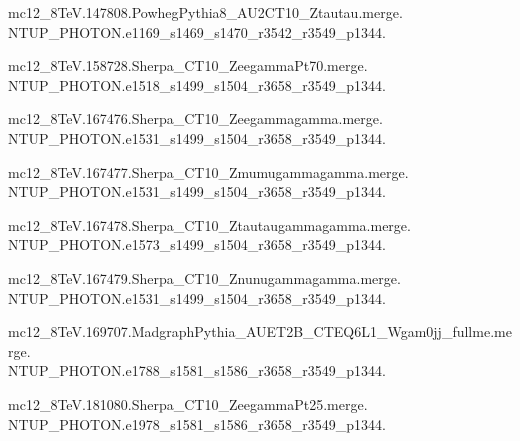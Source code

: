 mc12\_8TeV.147808.PowhegPythia8\_AU2CT10\_Ztautau.merge. \\NTUP\_PHOTON.e1169\_s1469\_s1470\_r3542\_r3549\_p1344.

mc12\_8TeV.158728.Sherpa\_CT10\_ZeegammaPt70.merge. \\NTUP\_PHOTON.e1518\_s1499\_s1504\_r3658\_r3549\_p1344.

mc12\_8TeV.167476.Sherpa\_CT10\_Zeegammagamma.merge. \\NTUP\_PHOTON.e1531\_s1499\_s1504\_r3658\_r3549\_p1344.

mc12\_8TeV.167477.Sherpa\_CT10\_Zmumugammagamma.merge. \\NTUP\_PHOTON.e1531\_s1499\_s1504\_r3658\_r3549\_p1344.

mc12\_8TeV.167478.Sherpa\_CT10\_Ztautaugammagamma.merge. \\NTUP\_PHOTON.e1573\_s1499\_s1504\_r3658\_r3549\_p1344.

mc12\_8TeV.167479.Sherpa\_CT10\_Znunugammagamma.merge. \\NTUP\_PHOTON.e1531\_s1499\_s1504\_r3658\_r3549\_p1344.

mc12\_8TeV.169707.MadgraphPythia\_AUET2B\_CTEQ6L1\_Wgam0jj\_fullme.merge. \\NTUP\_PHOTON.e1788\_s1581\_s1586\_r3658\_r3549\_p1344.

mc12\_8TeV.181080.Sherpa\_CT10\_ZeegammaPt25.merge. \\NTUP\_PHOTON.e1978\_s1581\_s1586\_r3658\_r3549\_p1344.
